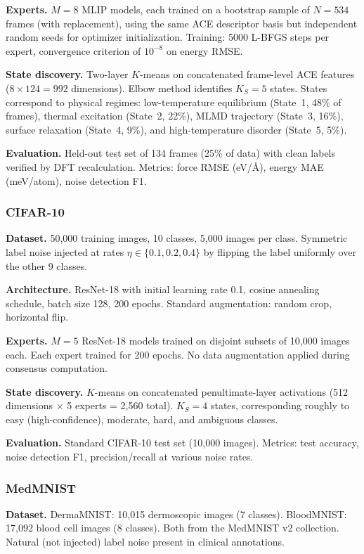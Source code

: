 \textbf{Experts.} $M = 8$ MLIP models, each trained on a bootstrap sample of $N = 534$ frames (with replacement), using the same ACE descriptor basis but independent random seeds for optimizer initialization. Training: 5000 L-BFGS steps per expert, convergence criterion of $10^{-8}$ on energy RMSE.

\textbf{State discovery.} Two-layer $K$-means on concatenated frame-level ACE features ($8 \times 124 = 992$ dimensions). Elbow method identifies $K_S = 5$ states. States correspond to physical regimes: low-temperature equilibrium (State~1, 48\% of frames), thermal excitation (State~2, 22\%), MLMD trajectory (State~3, 16\%), surface relaxation (State~4, 9\%), and high-temperature disorder (State~5, 5\%).

\textbf{Evaluation.} Held-out test set of 134 frames (25\% of data) with clean labels verified by DFT recalculation. Metrics: force RMSE (eV/{\AA}), energy MAE (meV/atom), noise detection F1.

\subsubsection{CIFAR-10}
\textbf{Dataset.} 50,000 training images, 10 classes, 5,000 images per class. Symmetric label noise injected at rates $\eta \in \{0.1, 0.2, 0.4\}$ by flipping the label uniformly over the other 9 classes.

\textbf{Architecture.} ResNet-18 with initial learning rate 0.1, cosine annealing schedule, batch size 128, 200 epochs. Standard augmentation: random crop, horizontal flip.

\textbf{Experts.} $M = 5$ ResNet-18 models trained on disjoint subsets of 10,000 images each. Each expert trained for 200 epochs. No data augmentation applied during consensus computation.

\textbf{State discovery.} $K$-means on concatenated penultimate-layer activations (512 dimensions $\times$ 5 experts = 2,560 total). $K_S = 4$ states, corresponding roughly to easy (high-confidence), moderate, hard, and ambiguous classes.

\textbf{Evaluation.} Standard CIFAR-10 test set (10,000 images). Metrics: test accuracy, noise detection F1, precision/recall at various noise rates.

\subsubsection{MedMNIST}
\textbf{Dataset.} DermaMNIST: 10,015 dermoscopic images (7 classes). BloodMNIST: 17,092 blood cell images (8 classes). Both from the MedMNIST v2 collection. Natural (not injected) label noise present in clinical annotations.

